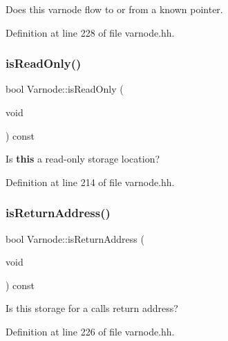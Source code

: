 Does this varnode flow to or from a known pointer. 



Definition at line 228 of file varnode.\+hh.

\mbox{\label{class_varnode_a913083bc0e21082b8f2d2c19c479149f}} 
\subsubsection{\texorpdfstring{isReadOnly()}{isReadOnly()}}
{\footnotesize\ttfamily bool Varnode\+::is\+Read\+Only (\begin{DoxyParamCaption}\item[{void}]{ }\end{DoxyParamCaption}) const\hspace{0.3cm}{\ttfamily [inline]}}



Is {\bfseries{this}} a read-\/only storage location? 



Definition at line 214 of file varnode.\+hh.

\mbox{\label{class_varnode_a7980ae27d26fa407b8332ef967d24b84}} 
\subsubsection{\texorpdfstring{isReturnAddress()}{isReturnAddress()}}
{\footnotesize\ttfamily bool Varnode\+::is\+Return\+Address (\begin{DoxyParamCaption}\item[{void}]{ }\end{DoxyParamCaption}) const\hspace{0.3cm}{\ttfamily [inline]}}



Is this storage for a calls return address? 



Definition at line 226 of file varnode.\+hh.

\mbox{\label{class_varnode_acd05a4490f361d118129cc0490072420}} 
